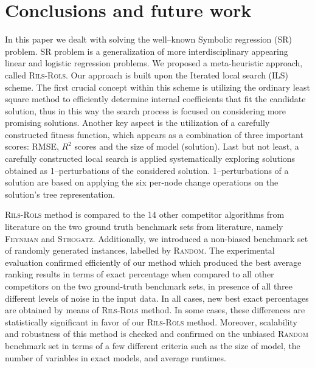 \documentclass[a4paper,12pt]{elsarticle}
\begin{document}
\section{Conclusions and future work}\label{sec:conclusions}

In this paper we dealt with solving the well--known Symbolic regression (SR)  problem. SR problem is a generalization of more interdisciplinary appearing  linear and logistic regression problems. %
We proposed a meta-heuristic approach, called \textsc{Rils}-\textsc{Rols}. Our approach is built upon   the Iterated local search (ILS) scheme. The first crucial concept within this scheme is utilizing the ordinary least square method to efficiently determine internal coefficients that fit the candidate solution,  thus in this way  the search process is focused on considering more promising solutions. Another key aspect is the utilization of a carefully constructed fitness function, which appears as  a combination of three important scores: RMSE, $R^2$  scores and the size of model (solution).  Last but not least, a carefully constructed local search is applied systematically exploring solutions obtained as 1--perturbations of the considered solution.  1--perturbations of a solution are based on applying the six per-node change operations on the solution's tree representation. 

\textsc{Rils-Rols} method is compared to the 14 other competitor algorithms from literature on the two ground truth benchmark sets from literature, namely \textsc{Feynman} and \textsc{Strogatz}.  Additionally, we introduced a non-biased benchmark set of randomly generated instances, labelled by \textsc{Random}.  The experimental evaluation confirmed efficiently of our method which produced the best average ranking results in terms of exact percentage when compared to all other competitors on the two ground-truth benchmark sets, in presence of all three different levels of noise in the input data. In all cases, new best exact percentages are obtained by means of \textsc{Rils-Rols} method. In some cases, these differences are  statistically significant in favor of our \textsc{Rils-Rols} method. Moreover, scalability and robustness of this method is  checked and confirmed on the unbiased \textsc{Random} benchmark set in terms of a few different criteria such as the size of model, the number of variables in exact models, and average runtimes. 
\end{document}
